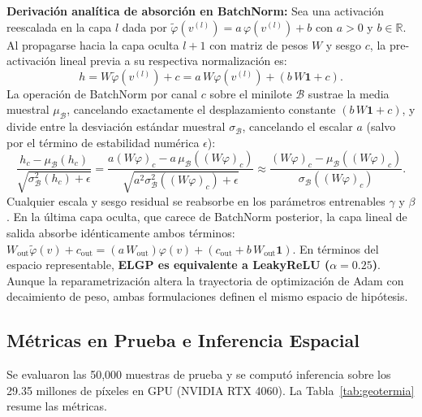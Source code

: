 \documentclass[10pt,twocolumn,letterpaper]{article}
\newcommand{\R}{\mathbb{R}}
\begin{document}
\textbf{Derivación analítica de absorción en BatchNorm:} Sea una activación reescalada en la capa $l$ dada por $\tilde\varphi(v^{(l)}) = a\,\varphi(v^{(l)}) + b$ con $a > 0$ y $b \in \R$. Al propagarse hacia la capa oculta $l+1$ con matriz de pesos $W$ y sesgo $c$, la pre-activación lineal previa a su respectiva normalización es:
\begin{equation}
  h = W\tilde\varphi(v^{(l)}) + c = a\,W\varphi(v^{(l)}) + (b\,W\mathbf{1} + c).
\end{equation}
La operación de BatchNorm por canal $c$ sobre el minilote $\mathcal{B}$ sustrae la media muestral $\mu_{\mathcal{B}}$, cancelando exactamente el desplazamiento constante $(b\,W\mathbf{1} + c)$, y divide entre la desviación estándar muestral $\sigma_{\mathcal{B}}$, cancelando el escalar $a$ (salvo por el término de estabilidad numérica $\epsilon$):
\begin{equation}
  \frac{h_c - \mu_{\mathcal{B}}(h_c)}{\sqrt{\sigma_{\mathcal{B}}^2(h_c) + \epsilon}} = \frac{a(W\varphi)_c - a\,\mu_{\mathcal{B}}((W\varphi)_c)}{\sqrt{a^2\sigma_{\mathcal{B}}^2((W\varphi)_c) + \epsilon}} \approx \frac{(W\varphi)_c - \mu_{\mathcal{B}}((W\varphi)_c)}{\sigma_{\mathcal{B}}((W\varphi)_c)}.
\end{equation}
Cualquier escala y sesgo residual se reabsorbe en los parámetros entrenables $\gamma$ y $\beta$. En la última capa oculta, que carece de BatchNorm posterior, la capa lineal de salida absorbe idénticamente ambos términos: $W_{\mathrm{out}}\tilde\varphi(v) + c_{\mathrm{out}} = (a\,W_{\mathrm{out}})\varphi(v) + (c_{\mathrm{out}} + b\,W_{\mathrm{out}}\mathbf{1})$. En términos del espacio representable, \textbf{ELGP es equivalente a LeakyReLU ($\alpha = 0.25$)}. Aunque la reparametrización altera la trayectoria de optimización de Adam con decaimiento de peso, ambas formulaciones definen el mismo espacio de hipótesis.

\subsection{Métricas en Prueba e Inferencia Espacial}
Se evaluaron las 50{,}000 muestras de prueba y se computó inferencia sobre los 29.35 millones de píxeles en GPU (NVIDIA RTX 4060). La Tabla~\ref{tab:geotermia} resume las métricas.
\end{document}
